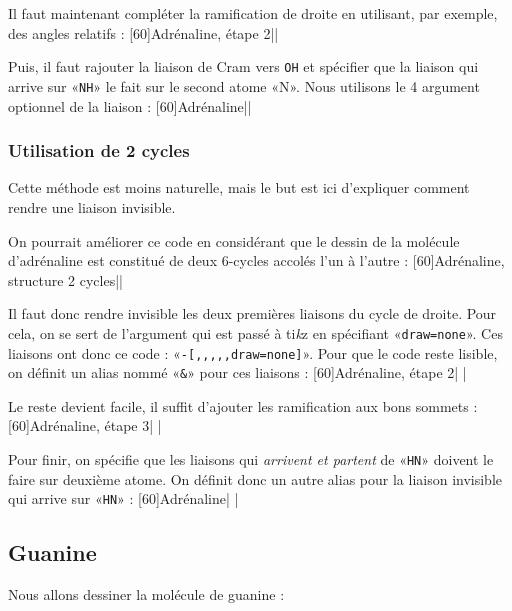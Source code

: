 \documentclass[10pt,french]{article}
\makeatletter
\newcommand\make@car@active[1]{%
	\catcode`#1\active
	\begingroup
		\lccode`\~`#1\relax
		\lowercase{\endgroup\def~}%
}
\newif\if@exstar
\newcommand\exemple{%
	\begingroup
	\parskip\z@
	\@makeother\;\@makeother\!\@makeother\?\@makeother\:%
	\@ifstar{\@exstartrue\exemple@}{\@exstarfalse\exemple@}}
\newcommand\exemple@[2][65]{%
	\medbreak\noindent
	\begingroup
		\let\do\@makeother\dospecials
		\make@car@active\ { {}}%
		\make@car@active\^^M{\par\leavevmode}%
		\make@car@active\^^I{\space\space}%
		\make@car@active\,{\leavevmode\kern\z@\string,}%
		\make@car@active\-{\leavevmode\kern\z@\string-}%
		\make@car@active\>{\leavevmode\kern\z@\string>}%
		\make@car@active\<{\leavevmode\kern\z@\string<}%
		\exemple@@{#1}{#2}%
}
\newcommand\exemple@@[3]{%
	\def\@tempa##1#3{\exemple@@@{#1}{#2}{##1}}%
	\@tempa
}
\newcommand\exemple@@@[3]{%
	\xdef\the@code{#3}%
	\endgroup
	\if@exstar
		\begingroup
			\fboxrule0.4pt
			\let\breakboxparindent\z@
			\def\bkvz@bottom{\hrule\@height\fboxrule}%
			\let\bkvz@before@breakbox\relax
			\def\bkvz@set@linewidth{\advance\linewidth\dimexpr-2\fboxrule-2\fboxsep}%
			\def\bkvz@left{\vrule\@width\fboxrule\hskip\fboxsep}%
			\def\bkvz@right{\hskip\fboxsep\vrule\@width\fboxrule}%
			\def\bkvz@top{\hbox to \hsize{%
				\vrule\@width\fboxrule\@height\fboxrule
				\leaders\bkvz@bottom\hfill
				\sffamily
				\fboxsep\z@
				\colorbox{black}{\kern0.25em\color{white}\footnotesize\lower0.5ex\hbox{\strut#2}\kern0.25em}%
				\leaders\bkvz@bottom\hfill
				\vrule\@width\fboxrule\@height\fboxrule}}%
			\breakbox
				\kern.5ex\relax
				\ttfamily\footnotesize\the@code\par
				\normalfont
				\kern3pt
				\hrule height0.1pt width\linewidth depth0.1pt
				\vskip5pt
				\rightskip0pt plus 1fill
				\everypar{{\color{lightgray}\rlap{\vrule height0.1pt width\linewidth depth0.1pt}}\hskip0pt plus 1fill}%
				\newlinechar`\^^M\everyeof{\noexpand}\scantokens{#3}\par
			\endbreakbox
		\endgroup
	\else
		\vskip0.5ex
		\boxput*(0,1)
			{\fboxsep\z@
			\hbox{\sffamily\colorbox{black}{\leavevmode\kern0.25em{\color{white}\footnotesize\strut#2}\kern0.25em}}%
			}%
			{\fboxsep5pt
			\fbox{%
				$\vcenter{\hsize\dimexpr0.#1\linewidth-\fboxsep-\fboxrule\relax
					\kern5pt\parskip0pt \ttfamily\footnotesize\the@code}%
				\vcenter{\kern5pt\hsize\dimexpr\linewidth-0.#1\linewidth-\fboxsep-\fboxrule\relax
					\everypar{{\color{lightgray}\rlap{\vrule height0.1pt width\dimexpr\linewidth-0.#1\linewidth-\fboxsep-\fboxrule depth0.1pt}}}%
					\footnotesize\newlinechar`\^^M\everyeof{\noexpand}\scantokens{#3}}$%
				}%
			}%
	\fi
	\medbreak
	\endgroup
}
\newcommand\TIKZ{ti\textit kz\xspace}
\makeatother
\begin{document}
Il faut maintenant compléter la ramification de droite en utilisant, par exemple, des angles relatifs :
\exemple[60]{Adrénaline, étape 2}||

Puis, il faut rajouter la liaison de Cram vers \verb-OH- et spécifier que la liaison qui arrive sur «\verb-NH-» le fait sur le second atome «N». Nous utilisons le 4\ieme{} argument optionnel de la liaison :
\exemple[60]{Adrénaline}||

\subsubsection{Utilisation de 2 cycles}
Cette méthode est moins naturelle, mais le but est ici d'expliquer comment rendre une liaison invisible.

On pourrait améliorer ce code en considérant que le dessin de la molécule d'adrénaline est constitué de deux 6-cycles accolés l'un à l'autre :
\exemple[60]{Adrénaline, structure 2 cycles}||

Il faut donc rendre invisible les deux premières liaisons du cycle de droite. Pour cela, on se sert de l'argument qui est passé à \TIKZ en spécifiant «\verb-draw=none-». Ces liaisons ont donc ce code : «\verb/-[,,,,,draw=none]/». Pour que le code reste lisible, on définit un alias nommé «\verb-&-» pour ces liaisons :
\exemple[60]{Adrénaline, étape 2}|
|

Le reste devient facile, il suffit d'ajouter les ramification aux bons sommets :
\exemple[60]{Adrénaline, étape 3}|
|

Pour finir, on spécifie que les liaisons qui \emph{arrivent et partent} de «\verb-HN-» doivent le faire sur deuxième atome. On définit donc un autre alias pour la liaison invisible qui arrive sur «\verb-HN-» :
\exemple[60]{Adrénaline}|
|

\subsection{Guanine}
Nous allons dessiner la molécule de guanine :
\medskip
\end{document}
